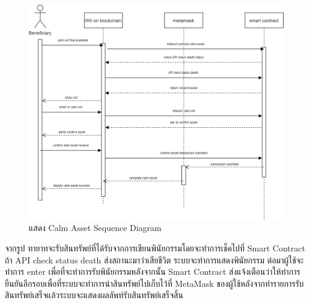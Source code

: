 \documentclass[12pt,oneside,openright,a4paper]{cpe-thai-project}
\begin{document}
\begin{enumerate}[label=\thesubsection.\arabic*,leftmargin=0pt,itemindent=2.5cm]
\begin{table}
{\begin{tabular}{|l|l|}
\hline
\end{tabular}
}
\end{table}
		\begin{figure}[!thb]
			\centering
			\includegraphics[scale=0.2]{calmAssetseq}
			\caption{แสดง Calm Asset Sequence Diagram}
		\end{figure}
		\FloatBarrier
	\tab จากรูป ทายาทจะรับสินทรัพย์ที่ได้รับจากการเขียนพินัยกรรมโดยจะทำการเช็คไปที่ Smart Contract ถ้า API check status death ส่งสถานะมาว่าเสียชีวิต ระบบจะทำการแสดงพินัยกรรม ต่อมาผู้ใช้จะทำการ enter เพื่อที่จะทำการรับพินัยกรรมหลังจากนั้น Smart Contract ส่งแจ้งเตือนว่าให้ทำการยืนยันอีกรอบเพื่อที่ระบบจะทำการนำสินทรัพย์ไปเก็บไว้ที่ MetaMask ของผู้ใช้หลังจากทำรายการรับสินทรัพย์เสร็จแล้วระบบจะแสดงผลลัพท์รับสินทรัพย์เสร็จสิ้น
	\end{enumerate}
\end{document}
